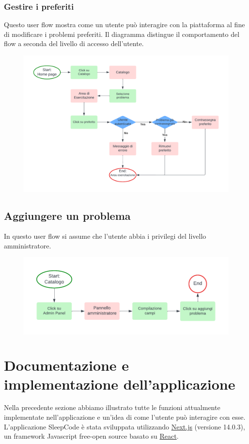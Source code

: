 \documentclass[11pt, a4paper]{article}
\theoremstyle{definition}
\begin{document}
\newpage\subsubsection*{Gestire i preferiti}
Questo user flow mostra come un utente può interagire con la piattaforma
al fine di modificare i problemi preferiti. Il diagramma distingue il
comportamento del flow a seconda del livello di accesso dell'utente.
\begin{figure}[H]
\centering
\includegraphics[width = \linewidth]{materiale/uflike.pdf}
\end{figure}
    

\subsection{Aggiungere un problema}
In questo user flow si assume che l'utente abbia i privilegi
del livello amministratore.
\begin{figure}[H]
\centering
\includegraphics[width = \linewidth]{materiale/ufadmin.pdf}
\end{figure}
  

\newpage
\section{Documentazione e implementazione dell'applicazione}
Nella precedente sezione abbiamo illustrato tutte le funzioni attualmente implementate nell'applicazione e un'idea di come l'utente può interagire con esse.
L'applicazione SleepCode è stata sviluppata utilizzando \href{https://nextjs.org/}{Next.js} (versione 14.0.3), un framework Javascript free-open source basato su \href{https://react.dev/}{React}.
\end{document}
